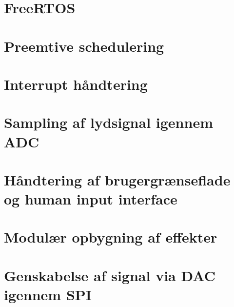 \section{FreeRTOS}

\section{Preemtive schedulering}

\section{Interrupt håndtering}

\section{Sampling af lydsignal igennem ADC}

\section{Håndtering af brugergrænseflade og human input interface}

\section{Modulær opbygning af effekter}

\section{Genskabelse af signal via DAC igennem SPI}

